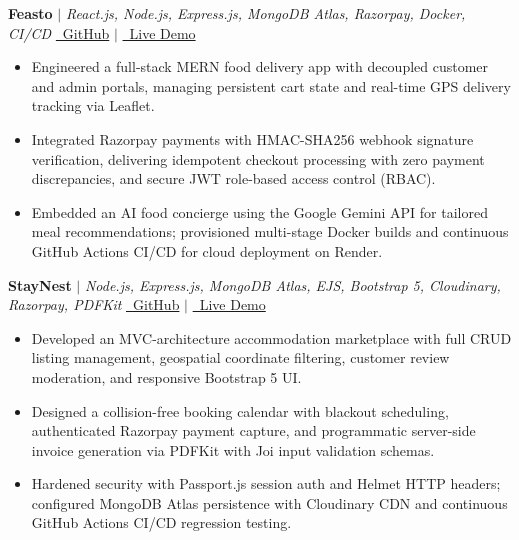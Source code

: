 \documentclass[letterpaper,10pt]{article}
\begin{document}
\noindent
\textbf{Feasto} \hspace{0.2em}$|$\hspace{0.2em} \textit{\small React.js, Node.js, Express.js, MongoDB Atlas, Razorpay, Docker, CI/CD} \hfill \href{https://github.com/AyushKumar-12345/Feasto}{\faGithub\ GitHub} \hspace{0.35em}$|$\hspace{0.35em} \href{https://feasto-frontend-qt0n.onrender.com}{\faExternalLink*\ Live Demo}
\begin{itemize}
    \item \small Engineered a full-stack MERN food delivery app with decoupled customer and admin portals, managing persistent cart state and real-time GPS delivery tracking via Leaflet.
    \item \small Integrated Razorpay payments with HMAC-SHA256 webhook signature verification, delivering idempotent checkout processing with zero payment discrepancies, and secure JWT role-based access control (RBAC).
    \item \small Embedded an AI food concierge using the Google Gemini API for tailored meal recommendations; provisioned multi-stage Docker builds and continuous GitHub Actions CI/CD for cloud deployment on Render.
\end{itemize}
\vspace{1.5pt}

\noindent
\textbf{StayNest} \hspace{0.2em}$|$\hspace{0.2em} \textit{\small Node.js, Express.js, MongoDB Atlas, EJS, Bootstrap 5, Cloudinary, Razorpay, PDFKit} \hfill \href{https://github.com/AyushKumar-12345/StayNest}{\faGithub\ GitHub} \hspace{0.35em}$|$\hspace{0.35em} \href{https://staynest-dnrm.onrender.com}{\faExternalLink*\ Live Demo}
\begin{itemize}
    \item \small Developed an MVC-architecture accommodation marketplace with full CRUD listing management, geospatial coordinate filtering, customer review moderation, and responsive Bootstrap 5 UI.
    \item \small Designed a collision-free booking calendar with blackout scheduling, authenticated Razorpay payment capture, and programmatic server-side invoice generation via PDFKit with Joi input validation schemas.
    \item \small Hardened security with Passport.js session auth and Helmet HTTP headers; configured MongoDB Atlas persistence with Cloudinary CDN and continuous GitHub Actions CI/CD regression testing.
\end{itemize}
\vspace{1.5pt}
\end{document}
